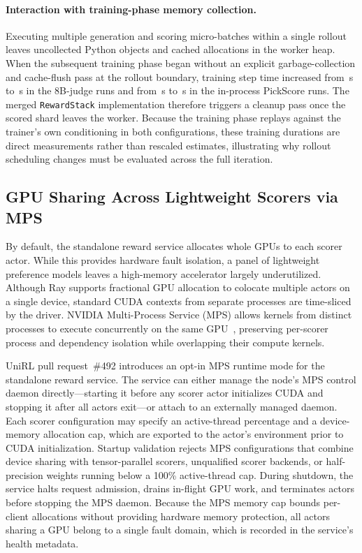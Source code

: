 \paragraph{Interaction with training-phase memory collection.}
Executing multiple generation and scoring micro-batches within a single rollout leaves uncollected Python objects and cached allocations in the worker heap.
When the subsequent training phase began without an explicit garbage-collection and cache-flush pass at the rollout boundary, training step time increased from \RSTrainRemoteCollect{}\,s to \RSTrainRemoteNoCollect{}\,s in the 8B-judge runs and from \RSTrainLocalCollect{}\,s to \RSTrainLocalNoCollect{}\,s in the in-process PickScore runs.
The merged \texttt{RewardStack} implementation therefore triggers a cleanup pass once the scored shard leaves the worker.
Because the training phase replays against the trainer's own conditioning in both configurations, these training durations are direct measurements rather than rescaled estimates, illustrating why rollout scheduling changes must be evaluated across the full iteration.

\subsection{GPU Sharing Across Lightweight Scorers via MPS}
\label{sec:reward-mps}

By default, the standalone reward service allocates whole GPUs to each scorer actor.
While this provides hardware fault isolation, a panel of lightweight preference models leaves a high-memory accelerator largely underutilized.
Although Ray supports fractional GPU allocation to colocate multiple actors on a single device, standard CUDA contexts from separate processes are time-sliced by the driver.
NVIDIA Multi-Process Service (MPS) allows kernels from distinct processes to execute concurrently on the same GPU~\citep{nvidiamps}, preserving per-scorer process and dependency isolation while overlapping their compute kernels.

UniRL pull request~\#492 introduces an opt-in MPS runtime mode for the standalone reward service.
The service can either manage the node's MPS control daemon directly---starting it before any scorer actor initializes CUDA and stopping it after all actors exit---or attach to an externally managed daemon.
Each scorer configuration may specify an active-thread percentage and a device-memory allocation cap, which are exported to the actor's environment prior to CUDA initialization.
Startup validation rejects MPS configurations that combine device sharing with tensor-parallel scorers, unqualified scorer backends, or half-precision weights running below a 100\% active-thread cap.
During shutdown, the service halts request admission, drains in-flight GPU work, and terminates actors before stopping the MPS daemon.
Because the MPS memory cap bounds per-client allocations without providing hardware memory protection, all actors sharing a GPU belong to a single fault domain, which is recorded in the service's health metadata.

